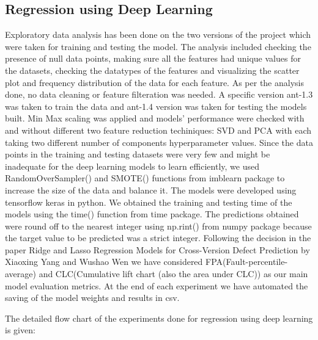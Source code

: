 \subsection{Regression using Deep Learning}

Exploratory data analysis has been done on the two versions of the project which were taken for training and testing the model. The analysis included checking the presence of null data points, making sure all the features had unique values for the datasets, checking the datatypes of the features and visualizing the scatter plot and frequency distribution of the data for each feature. As per the analysis done, no data cleaning or feature filteration was needed. A specific version ant-1.3 was taken to train the data and ant-1.4 version was taken for testing the models built. Min Max scaling was applied and models' performance were checked with and without different two feature reduction techiniques: SVD and PCA with each taking two different number of components hyperparameter values. Since the data points in the training and testing datasets were very few and might be inadequate for the deep learning models to learn efficiently, we used RandomOverSampler() and SMOTE() functions from imblearn package to increase the size of the data and balance it. The models were developed using tensorflow keras in python. We obtained the training and testing time of the models using the time() function from time package. The predictions obtained were round off to the nearest integer using np.rint() from numpy package because the target value to be predicted was a strict integer. Following the decision in the paper Ridge and Lasso Regression Models for Cross-Version Defect Prediction by Xiaoxing Yang and Wushao Wen we have considered FPA(Fault-percentile-average) and CLC(Cumulative lift chart (also the area under CLC)) as our main model evaluation metrics. At the end of each experiment we have automated the saving of the model weights and results in csv. 

The detailed flow chart of the experiments done for regression using deep learning is given:

